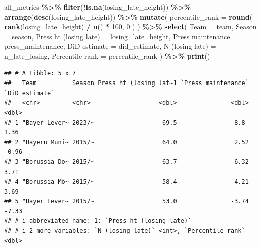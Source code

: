 \documentclass[
]{article}
\newenvironment{Shaded}{\begin{snugshade}}{\end{snugshade}}
\newcommand{\AttributeTok}[1]{\textcolor[rgb]{0.13,0.29,0.53}{#1}}
\newcommand{\DecValTok}[1]{\textcolor[rgb]{0.00,0.00,0.81}{#1}}
\newcommand{\FunctionTok}[1]{\textcolor[rgb]{0.13,0.29,0.53}{\textbf{#1}}}
\newcommand{\NormalTok}[1]{#1}
\newcommand{\OtherTok}[1]{\textcolor[rgb]{0.56,0.35,0.01}{#1}}
\newcommand{\SpecialCharTok}[1]{\textcolor[rgb]{0.81,0.36,0.00}{\textbf{#1}}}
\newcommand{\StringTok}[1]{\textcolor[rgb]{0.31,0.60,0.02}{#1}}
\begin{document}
\begin{Shaded}
\begin{Highlighting}[]
\NormalTok{all\_metrics }\SpecialCharTok{\%\textgreater{}\%}
  \FunctionTok{filter}\NormalTok{(}\SpecialCharTok{!}\FunctionTok{is.na}\NormalTok{(losing\_late\_height)) }\SpecialCharTok{\%\textgreater{}\%}
  \FunctionTok{arrange}\NormalTok{(}\FunctionTok{desc}\NormalTok{(losing\_late\_height)) }\SpecialCharTok{\%\textgreater{}\%}
  \FunctionTok{mutate}\NormalTok{(}
    \AttributeTok{percentile\_rank =} \FunctionTok{round}\NormalTok{(}
      \FunctionTok{rank}\NormalTok{(losing\_late\_height) }\SpecialCharTok{/} \FunctionTok{n}\NormalTok{() }\SpecialCharTok{*} \DecValTok{100}\NormalTok{, }\DecValTok{0}
\NormalTok{    )}
\NormalTok{  ) }\SpecialCharTok{\%\textgreater{}\%}
  \FunctionTok{select}\NormalTok{(}
    \AttributeTok{Team              =}\NormalTok{ team,}
    \AttributeTok{Season            =}\NormalTok{ season,}
    \StringTok{\textasciigrave{}}\AttributeTok{Press ht (losing late)}\StringTok{\textasciigrave{}}  \OtherTok{=}\NormalTok{ losing\_late\_height,}
    \StringTok{\textasciigrave{}}\AttributeTok{Press maintenance}\StringTok{\textasciigrave{}}       \OtherTok{=}\NormalTok{ press\_maintenance,}
    \StringTok{\textasciigrave{}}\AttributeTok{DiD estimate}\StringTok{\textasciigrave{}}            \OtherTok{=}\NormalTok{ did\_estimate,}
    \StringTok{\textasciigrave{}}\AttributeTok{N (losing late)}\StringTok{\textasciigrave{}}         \OtherTok{=}\NormalTok{ n\_late\_losing,}
    \StringTok{\textasciigrave{}}\AttributeTok{Percentile rank}\StringTok{\textasciigrave{}}         \OtherTok{=}\NormalTok{ percentile\_rank}
\NormalTok{  ) }\SpecialCharTok{\%\textgreater{}\%}
  \FunctionTok{print}\NormalTok{()}
\end{Highlighting}
\end{Shaded}

\begin{verbatim}
## # A tibble: 5 x 7
##   Team          Season Press ht (losing lat~1 `Press maintenance` `DiD estimate`
##   <chr>         <chr>                   <dbl>               <dbl>          <dbl>
## 1 "Bayer Lever~ 2023/~                   69.5                8.8            1.36
## 2 "Bayern Muni~ 2015/~                   64.0                2.52          -0.96
## 3 "Borussia Do~ 2015/~                   63.7                6.32           3.71
## 4 "Borussia Mö~ 2015/~                   58.4                4.21           3.69
## 5 "Bayer Lever~ 2015/~                   53.0               -3.74          -7.33
## # i abbreviated name: 1: `Press ht (losing late)`
## # i 2 more variables: `N (losing late)` <int>, `Percentile rank` <dbl>
\end{verbatim}
\end{document}
